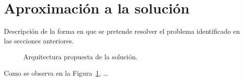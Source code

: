 \section{Aproximación a la solución}
\label{sec:aproximacion}


Descripción de la forma en que se pretende resolver el problema
identificado en las secciones anteriores.

\begin{figure}[H]
  \centering
  \caption{Arquitectura propuesta de la solución.}
  \label{fig:arquitectura}
\end{figure}

Como se observa en la Figura~\ref{fig:arquitectura}, \dots
